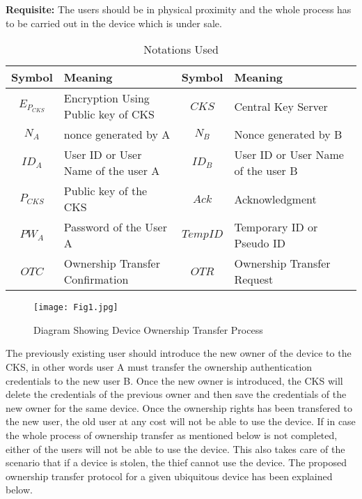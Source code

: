 \documentclass[letterpaper]{article}
\begin{document}
\textbf{Requisite:} The users should be in physical proximity and the whole process has to be carried out in the device which is under sale.

\begin{table*}[bpht!]
\centering
	\caption{Notations Used} 
	\label{tab}
\begin{tabular}{|c|p{2in}|c|p{2in}|}
	\hline 
	\textbf{Symbol}&\textbf{Meaning}&\textbf{Symbol}&\textbf{Meaning} \\ \hline 
			
			$E_{P_{CKS}}$&Encryption Using Public key of CKS&$CKS$&Central Key Server\\ \hline 
			$N_A$&nonce generated by A& $N_B$&Nonce generated by B \\ \hline
			$ID_A$&User ID or User Name of the user A&$ID_B$&User ID or User Name of the user B\\ \hline 
			$P_{CKS}$&Public key of the CKS&$Ack$& Acknowledgment\\ \hline
			$PW_A$&Password of the User A&$Temp ID$& Temporary ID or Pseudo ID\\ \hline 
			$OTC$&Ownership Transfer Confirmation&$OTR$&Ownership Transfer Request\\ \hline
		  
	\end{tabular}
\end{table*}	  


\begin{figure*}[bpht!]
\centering
\texttt{[image: Fig1.jpg]}
\caption{Diagram Showing Device Ownership Transfer Process}
\label{fig:1}
\end{figure*}
	
The previously existing user should introduce the new owner of the device to the CKS, in other words user A must transfer the ownership authentication credentials to the new user B. Once the new owner is introduced, the CKS will delete the credentials of the previous owner and then save the credentials of the new owner for the same device. Once the ownership rights has been transfered to the new user, the old user at any cost will not be able to use the device. If in case the whole process of ownership transfer as mentioned below is not completed, either of the users will not be able to use the device. This also takes care of the scenario that if a device is stolen, the thief cannot use the device. The proposed ownership transfer protocol for a given ubiquitous device has been explained below.
			
\end{document}
